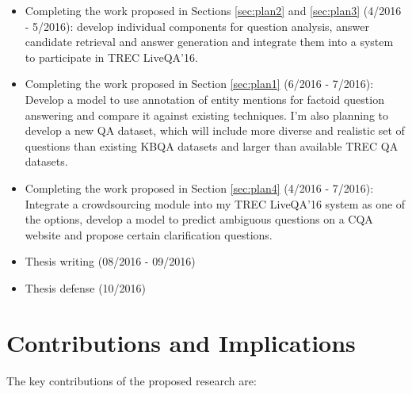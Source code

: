 \begin{itemize}
\item Completing the work proposed in Sections \ref{sec:plan2} and \ref{sec:plan3} (4/2016 - 5/2016): develop individual components for question analysis, answer candidate retrieval and answer generation and integrate them into a system to participate in TREC LiveQA'16.
\item Completing the work proposed in Section \ref{sec:plan1} (6/2016 - 7/2016): Develop a model to use annotation of entity mentions for factoid question answering and compare it against existing techniques. I'm also planning to develop a new QA dataset, which will include more diverse and realistic set of questions than existing KBQA datasets and larger than available TREC QA datasets.
\item Completing the work proposed in Section \ref{sec:plan4} (4/2016 - 7/2016): Integrate a crowdsourcing module into my TREC LiveQA'16 system as one of the options, develop a model to predict ambiguous questions on a CQA website and propose certain clarification questions.
\item Thesis writing (08/2016 - 09/2016) 
\item Thesis defense (10/2016)
\end{itemize}


\section{Contributions and Implications}

The key contributions of the proposed research are:


